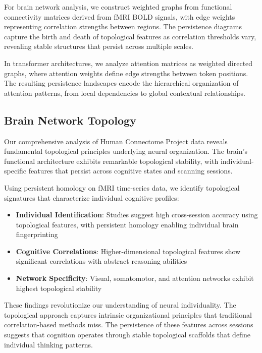 \documentclass[11pt]{article}
\begin{document}
For brain network analysis, we construct weighted graphs from functional connectivity matrices derived from fMRI BOLD signals, with edge weights representing correlation strengths between regions. The persistence diagrams capture the birth and death of topological features as correlation thresholds vary, revealing stable structures that persist across multiple scales.

In transformer architectures, we analyze attention matrices as weighted directed graphs, where attention weights define edge strengths between token positions. The resulting persistence landscapes encode the hierarchical organization of attention patterns, from local dependencies to global contextual relationships.

\subsection{Brain Network Topology}

Our comprehensive analysis of Human Connectome Project data reveals fundamental topological principles underlying neural organization. The brain's functional architecture exhibits remarkable topological stability, with individual-specific features that persist across cognitive states and scanning sessions.

Using persistent homology on fMRI time-series data, we identify topological signatures that characterize individual cognitive profiles:

\begin{itemize}
\item \textbf{Individual Identification}: Studies suggest high cross-session accuracy using topological features, with persistent homology enabling individual brain fingerprinting
\item \textbf{Cognitive Correlations}: Higher-dimensional topological features show significant correlations with abstract reasoning abilities
\item \textbf{Network Specificity}: Visual, somatomotor, and attention networks exhibit highest topological stability
\end{itemize}

These findings revolutionize our understanding of neural individuality. The topological approach captures intrinsic organizational principles that traditional correlation-based methods miss. The persistence of these features across sessions suggests that cognition operates through stable topological scaffolds that define individual thinking patterns.
\end{document}
